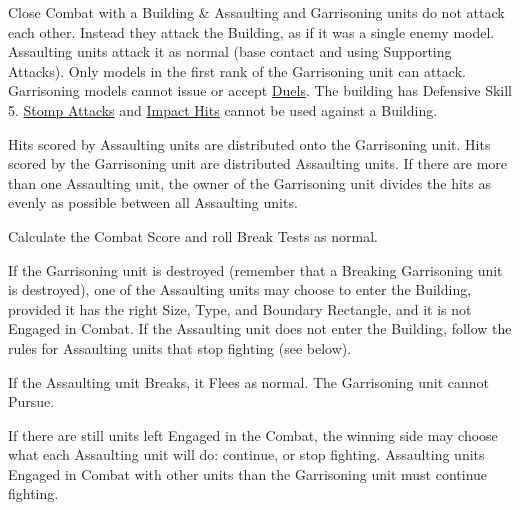 \begin{tableterrain}
Close Combat with a Building & Assaulting and Garrisoning units do not attack each other. Instead they attack the Building, as if it was a single enemy model. Assaulting units attack it as normal (base contact and using Supporting Attacks). Only models in the first rank of the Garrisoning unit can attack. Garrisoning models cannot issue or accept \hyperref[duels]{Duels}. The building has Defensive Skill 5. \hyperref[stomp_attacks]{Stomp Attacks} and \hyperref[impact_hits]{Impact Hits} cannot be used against a Building.\vspace*{5pt}\par
{}\vspace*{5pt}\par
Hits scored by Assaulting units are distributed onto the Garrisoning unit. Hits scored by the Garrisoning unit are distributed  Assaulting units. If there are more than one Assaulting unit, the owner of the Garrisoning unit divides the hits as evenly as possible between all Assaulting units.\vspace*{5pt}\par
Calculate the Combat Score and roll Break Tests as normal.\vspace*{5pt}\par
If the Garrisoning unit is destroyed (remember that a Breaking Garrisoning unit is destroyed), one of the Assaulting units may choose to enter the Building, provided it has the right Size, Type, and Boundary Rectangle, and it is not Engaged in Combat. If the Assaulting unit does not enter the Building, follow the rules for Assaulting units that stop fighting (see below).\vspace*{5pt}\par
If the Assaulting unit Breaks, it Flees as normal. The Garrisoning unit cannot Pursue.\par
If there are still units left Engaged in the Combat, the winning side may choose what each Assaulting unit will do: continue, or stop fighting. Assaulting units Engaged in Combat with other units than the Garrisoning unit must continue fighting.\vspace*{3pt}\par

\end{tableterrain}
